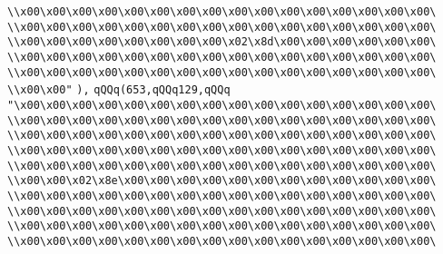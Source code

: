 \verb|\\x00\x00\x00\x00\x00\x00\x00\x00\x00\x00\x00\x00\x00\x00\x00\x00\|\newline
\verb|\\x00\x00\x00\x00\x00\x00\x00\x00\x00\x00\x00\x00\x00\x00\x00\x00\|\newline
\verb|\\x00\x00\x00\x00\x00\x00\x00\x00\x02\x8d\x00\x00\x00\x00\x00\x00\|\newline
\verb|\\x00\x00\x00\x00\x00\x00\x00\x00\x00\x00\x00\x00\x00\x00\x00\x00\|\newline
\verb|\\x00\x00\x00\x00\x00\x00\x00\x00\x00\x00\x00\x00\x00\x00\x00\x00\|\newline
\verb|\\x00\x00"|\newline
\verb|),|\newline
\verb|qQQq(653,qQQq129,qQQq|\newline
\verb|"\x00\x00\x00\x00\x00\x00\x00\x00\x00\x00\x00\x00\x00\x00\x00\x00\|\newline
\verb|\\x00\x00\x00\x00\x00\x00\x00\x00\x00\x00\x00\x00\x00\x00\x00\x00\|\newline
\verb|\\x00\x00\x00\x00\x00\x00\x00\x00\x00\x00\x00\x00\x00\x00\x00\x00\|\newline
\verb|\\x00\x00\x00\x00\x00\x00\x00\x00\x00\x00\x00\x00\x00\x00\x00\x00\|\newline
\verb|\\x00\x00\x00\x00\x00\x00\x00\x00\x00\x00\x00\x00\x00\x00\x00\x00\|\newline
\verb|\\x00\x00\x02\x8e\x00\x00\x00\x00\x00\x00\x00\x00\x00\x00\x00\x00\|\newline
\verb|\\x00\x00\x00\x00\x00\x00\x00\x00\x00\x00\x00\x00\x00\x00\x00\x00\|\newline
\verb|\\x00\x00\x00\x00\x00\x00\x00\x00\x00\x00\x00\x00\x00\x00\x00\x00\|\newline
\verb|\\x00\x00\x00\x00\x00\x00\x00\x00\x00\x00\x00\x00\x00\x00\x00\x00\|\newline
\verb|\\x00\x00\x00\x00\x00\x00\x00\x00\x00\x00\x00\x00\x00\x00\x00\x00\|\newline
